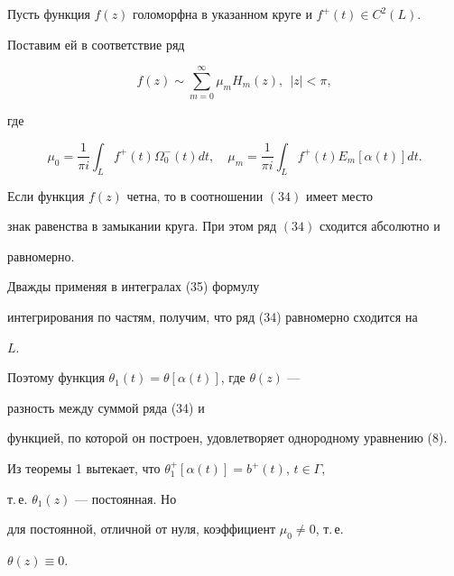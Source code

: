  


Пусть функция $f(z)$ голоморфна в указанном круге и $f^+(t)\in C^2(L)$. 


Поставим ей в соответствие ряд 


\begin{equation} 


f(z)\sim\sum^\infty_{m=0} \mu_m H_m(z),\ \ |z|<\pi, 


\end{equation} 


где 


\begin{equation} 


\mu_0=\frac{1}{\pi i}\int_L f^+(t)\Omega^-_0(t)d t,\quad 


\mu_m=\frac{1}{\pi i}\int_L f^+(t)E_m[\alpha(t)]d t. 


\end{equation} 


 


\begin{thm} 


Если функция $f(z)$ четна, то в соотношении $(34)$ имеет место  


знак равенства в замыкании круга. При этом ряд $(34)$ сходится абсолютно и 


равномерно. 


\end{thm} 


 


\begin{pf} 


Дважды применяя в интегралах (35) формулу  


интегрирования по частям, получим, что ряд (34) равномерно сходится на 


$L$.  


Поэтому функция $\theta_1(t)=\theta[\alpha(t)]$, где $\theta(z)$ --- 


разность между суммой ряда (34) и  


функцией, по которой он построен, удовлетворяет однородному уравнению (8).  


Из теоремы 1 вытекает, что $\theta^+_1[\alpha(t)]=b^+(t)$, $t\in\Gamma$, 


т.\,е. $\theta_1(z)$ --- постоянная. Но 


для постоянной, отличной от нуля, коэффициент $\mu_0\ne0$, т.\,е. 


$\theta(z)\equiv0$. 


\end{pf} 


